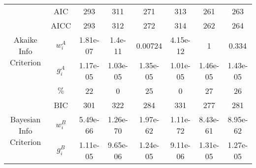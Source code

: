 \begin{tabular}{|cc|c|c|c|c|c|c|}
\cline{1-8}
\hline \multirow{5}{*}{Akaike Info Criterion} & AIC &                                      293 &                                      311 &                                      271 &                                      313 &                                      261 &                                      263 \\
          & AICC &                                      293 &                                      312 &                                      272 &                                      314 &                                      262 &                                      264 \\
          & $w_i^A$ &                                 1.81e-07 &                                  1.4e-11 &                                  0.00724 &                                 4.15e-12 &                                        1 &                                    0.334 \\
          & $g_i^A$ &                                 1.17e-05 &                                 1.03e-05 &                                 1.35e-05 &                                 1.01e-05 &                                 1.46e-05 &                                 1.43e-05 \\
          & $\%$ &                                       22 &                                        0 &                                       25 &                                        0 &                                       27 &                                       26 \\
\cline{1-8}
\hline \multirow{4}{*}{Bayesian Info Criterion} & BIC &                                      301 &                                      322 &                                      284 &                                      331 &                                      277 &                                      281 \\
          & $w_i^B$ &                                 5.49e-66 &                                 1.26e-70 &                                 1.97e-62 &                                 1.11e-72 &                                 8.43e-61 &                                 8.95e-62 \\
          & $g_i^B$ &                                 1.11e-05 &                                 9.65e-06 &                                 1.24e-05 &                                 9.11e-06 &                                 1.31e-05 &                                 1.27e-05 \\

\end{tabular}
